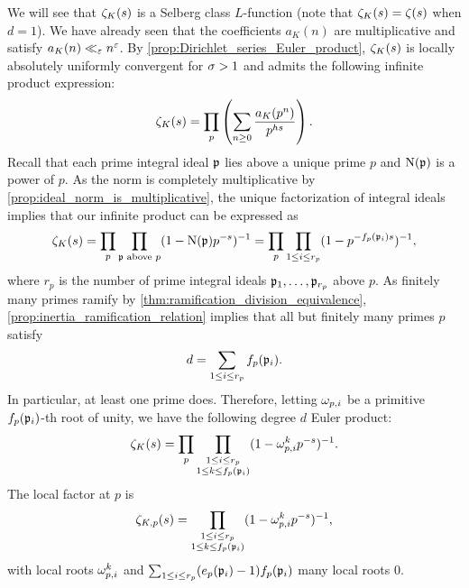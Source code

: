       We will see that $\zeta_{K}(s)$ is a Selberg class $L$-function (note that $\zeta_{K}(s) = \zeta(s)$ when $d = 1$). We have already seen that the coefficients $a_{K}(n)$ are multiplicative and satisfy $a_{K}(n) \ll_{\varepsilon} n^{\varepsilon}$. By \cref{prop:Dirichlet_series_Euler_product}, $\zeta_{K}(s)$ is locally absolutely uniformly convergent for $\sigma > 1$ and admits the following infinite product expression:
      \[
        \zeta_{K}(s) = \prod_{p}\left(\sum_{n \ge 0}\frac{a_{K}(p^{n})}{p^{hs}}\right).
      \]
      Recall that each prime integral ideal $\mathfrak{p}$ lies above a unique prime $p$ and $\operatorname{\mathrm{N}}(\mathfrak{p})$ is a power of $p$. As the norm is completely multiplicative by \cref{prop:ideal_norm_is_multiplicative}, the unique factorization of integral ideals implies that our infinite product can be expressed as
      \[
        \zeta_{K}(s) = \prod_{p}\prod_{\text{$\mathfrak{p}$ above $p$}}(1-\operatorname{\mathrm{N}}(\mathfrak{p})p^{-s})^{-1} = \prod_{p}\prod_{1 \le i \le r_{p}}(1-p^{-f_{p}(\mathfrak{p}_{i})s})^{-1},
      \]
      where $r_{p}$ is the number of prime integral ideals $\mathfrak{p}_{1},\ldots,\mathfrak{p}_{r_{p}}$ above $p$. As finitely many primes ramify by \cref{thm:ramification_division_equivalence}, \cref{prop:inertia_ramification_relation} implies that all but finitely many primes $p$ satisfy
      \[
        d = \sum_{1 \le i \le r_{p}}f_{p}(\mathfrak{p}_{i}).
      \]
      In particular, at least one prime does. Therefore, letting $\omega_{p,i}$ be a primitive $f_{p}(\mathfrak{p}_{i})$-th root of unity, we have the following degree $d$ Euler product:
      \[
        \zeta_{K}(s) = \prod_{p}\prod_{\substack{1 \le i \le r_{p} \\ 1 \le k \le f_{p}(\mathfrak{p}_{i})}}(1-\omega_{p,i}^{k}p^{-s})^{-1}.
      \]
      The local factor at $p$ is
      \[
        \zeta_{K,p}(s) = \prod_{\substack{1 \le i \le r_{p} \\ 1 \le k \le f_{p}(\mathfrak{p}_{i})}}(1-\omega_{p,i}^{k}p^{-s})^{-1},
      \]
      with local roots $\omega_{p,i}^{k}$ and $\sum_{1 \le i \le r_{p}}(e_{p}(\mathfrak{p}_{i})-1)f_{p}(\mathfrak{p}_{i})$ many local roots $0$.
